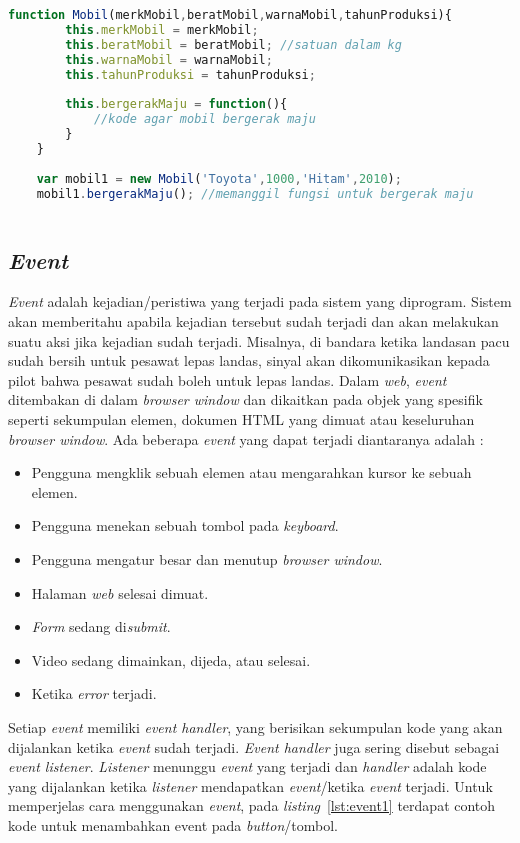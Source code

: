 \begin{lstlisting}[language=Javascript, caption=Membuat dan memanggil method bergerakMaju(), label={lst:method}]
	function Mobil(merkMobil,beratMobil,warnaMobil,tahunProduksi){
		this.merkMobil = merkMobil;
		this.beratMobil = beratMobil; //satuan dalam kg
		this.warnaMobil = warnaMobil;
		this.tahunProduksi = tahunProduksi;
		
		this.bergerakMaju = function(){
			//kode agar mobil bergerak maju
		}
	}
	
	var mobil1 = new Mobil('Toyota',1000,'Hitam',2010);
	mobil1.bergerakMaju(); //memanggil fungsi untuk bergerak maju
	
\end{lstlisting}

\subsection{\textit{Event}}
\textit{Event} adalah kejadian/peristiwa yang terjadi pada sistem yang diprogram. Sistem akan memberitahu apabila kejadian tersebut sudah terjadi dan akan melakukan suatu aksi jika kejadian sudah terjadi. Misalnya, di bandara ketika landasan pacu sudah bersih untuk pesawat lepas landas, sinyal akan dikomunikasikan kepada pilot bahwa pesawat sudah boleh untuk lepas landas. Dalam \textit{web}, \textit{event} ditembakan di dalam \textit{browser window} dan dikaitkan pada objek yang spesifik seperti sekumpulan elemen, dokumen HTML yang dimuat atau keseluruhan \textit{browser window}. Ada beberapa \textit{event} yang dapat terjadi diantaranya adalah : 

\begin{itemize}
	\item Pengguna mengklik sebuah elemen atau mengarahkan kursor ke sebuah elemen.
	\item Pengguna menekan sebuah tombol pada \textit{keyboard}.
	\item Pengguna mengatur besar dan menutup \textit{browser window}.
	\item Halaman \textit{web} selesai dimuat.
	\item \textit{Form} sedang di\textit{submit}.
	\item Video sedang dimainkan, dijeda, atau selesai.
	\item Ketika \textit{error} terjadi.
\end{itemize}

Setiap \textit{event} memiliki \textit{event handler}, yang berisikan sekumpulan kode yang akan dijalankan ketika \textit{event} sudah terjadi. \textit{Event handler} juga sering disebut sebagai \textit{event listener}. \textit{Listener} menunggu \textit{event} yang terjadi dan \textit{handler} adalah kode yang dijalankan ketika \textit{listener} mendapatkan \textit{event}/ketika \textit{event} terjadi. Untuk memperjelas cara menggunakan \textit{event}, pada \textit{listing}~\ref{lst:event1} terdapat contoh kode untuk menambahkan event pada \textit{button}/tombol.

